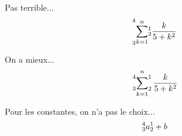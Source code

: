 \documentclass[10pt,a4paper]{article}
\begin{document}
Pas terrible... 
\[
	\prescript{4}{3}{ \sum_{k = 1}^{n} }^{1}_{2}  {\frac{k}{5 + k^2}} 
\]


On a mieux...
\[
	\sideset{_3^4}{_2^1}\sum_{k = 1}^{n} {\frac{k}{5 + k^2}}
\]


Pour les constantes, on n'a pas le choix...
\[
	\prescript{4}{3}{a}^{1}_{2} + b 
\]
\end{document}
